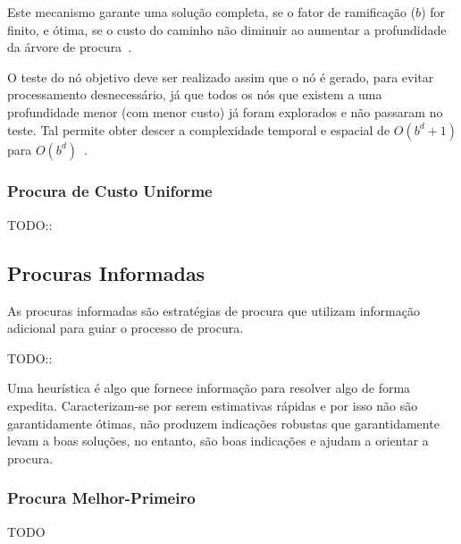 Este mecanismo garante uma solução completa, se o fator de ramificação ($b$) for finito, e ótima, se o custo do caminho não diminuir ao aumentar a profundidade da árvore de procura~\cite{ist:leic:resumos:procura-cega}.

O teste do nó objetivo deve ser realizado assim que o nó é gerado, para evitar processamento desnecessário,
já que todos os nós que existem a uma profundidade menor (com menor custo) já foram explorados e não passaram no teste.
Tal permite obter descer a complexidade temporal e espacial de $O(b^d+1)$ para $O(b^d)$~\cite{ist:leic:resumos:procura-cega}.

\subsubsection{Procura de Custo Uniforme}\label{subsubsec:procura-custo-uniforme}

TODO::

\subsection{Procuras Informadas}\label{subsec:procuras-informadas}

As procuras informadas são estratégias de procura que utilizam informação adicional para guiar o processo de procura.

TODO::

Uma heurística é algo que fornece informação para resolver algo de forma expedita.
Caracterizam-se por serem estimativas rápidas e por isso não são garantidamente ótimas, não produzem indicações robustas que garantidamente levam a boas soluções, no entanto, são boas indicações e ajudam a orientar a procura.

\subsubsection{Procura Melhor-Primeiro}\label{subsubsec:procura-melhor-primeiro}

TODO
